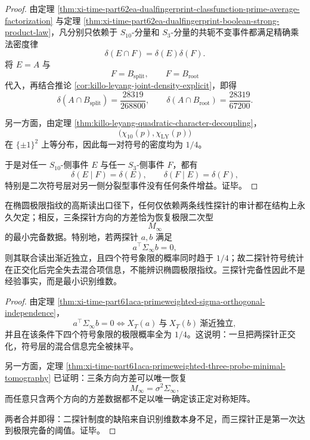 \begin{proof}
由定理 \ref{thm:xi-time-part62ea-dualfingerprint-classfunction-prime-average-factorization} 与定理 \ref{thm:xi-time-part62ea-dualfingerprint-boolean-strong-product-law}，凡分别只依赖于 \(S_{10}\)-分量和 \(S_3\)-分量的共轭不变事件都满足精确乘法密度律
\[
\delta(E\cap F)=\delta(E)\delta(F).
\]
将 \(E=A\) 与
\[
F=B_{\mathrm{split}},\qquad F=B_{\mathrm{root}}
\]
代入，再结合推论 \ref{cor:killo-leyang-joint-density-explicit}，即得
\[
\delta(A\cap B_{\mathrm{split}})=\frac{28319}{268800},
\qquad
\delta(A\cap B_{\mathrm{root}})=\frac{28319}{67200}.
\]

另一方面，由定理 \ref{thm:killo-leyang-quadratic-character-decoupling}，
\[
\bigl(\chi_{10}(p),\chi_{\mathrm{LY}}(p)\bigr)
\]
在 \(\{\pm1\}^2\) 上等分布，因此每一对符号的密度均为 \(1/4\)。

于是对任一 \(S_{10}\)-侧事件 \(E\) 与任一 \(S_3\)-侧事件 \(F\)，都有
\[
\delta(E\mid F)=\delta(E),
\qquad
\delta(F\mid E)=\delta(F),
\]
特别是二次符号层对另一侧分裂型事件没有任何条件增益。证毕。
\end{proof}

\begin{corollary}\label{cor:derived-three-probe-minimal-completeness}
在椭圆极限指纹的高斯读出口径下，任何仅依赖两条线性探针的审计都在结构上永久欠定；相反，三条探针方向的方差恰为恢复极限二次型
\[
M_\infty
\]
的最小完备数据。特别地，若两探针 \(a,b\) 满足
\[
a^\top\Sigma_\infty b=0,
\]
则其联合读出渐近独立，且四个符号象限的概率同时趋于 \(1/4\)；故二探针符号统计在正交化后完全失去混合项信息，不能辨识椭圆极限指纹。三探针完备性因此不是经验事实，而是最小识别维数。
\end{corollary}

\begin{proof}
由定理 \ref{thm:xi-time-part61aca-primeweighted-sigma-orthogonal-independence}，
\[
a^\top\Sigma_\infty b=0
\iff
X_T(a)\ \text{与}\ X_T(b)\ \text{渐近独立},
\]
并且在该条件下四个符号象限的极限概率全为 \(1/4\)。这说明：一旦把两探针正交化，符号层的混合信息完全被抹平。

另一方面，定理 \ref{thm:xi-time-part61aca-primeweighted-three-probe-minimal-tomography} 已证明：三条方向方差可以唯一恢复
\[
M_\infty=\sigma^2\Sigma_\infty,
\]
而任意只含两个方向的方差数据都不足以唯一确定该正定对称矩阵。

两者合并即得：二探针制度的缺陷来自识别维数本身不足，而三探针正是第一次达到极限完备的阈值。证毕。
\end{proof}

\endinput
